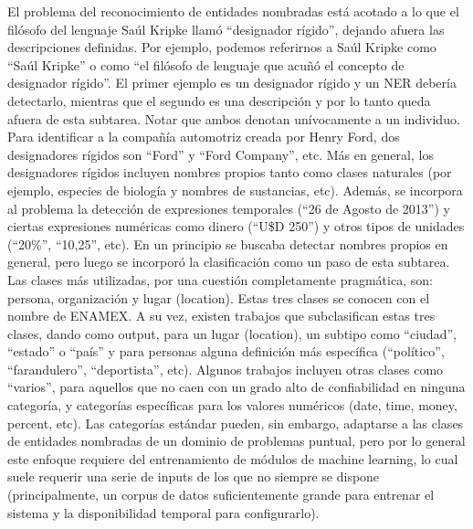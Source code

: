 El problema del reconocimiento de entidades nombradas está acotado a lo que el filósofo del lenguaje Saúl Kripke llamó “designador rígido”, dejando afuera las descripciones definidas. Por ejemplo, podemos referirnos a Saúl Kripke como “Saúl Kripke” o como “el filósofo de lenguaje que acuñó el concepto de designador rígido”. El primer ejemplo es un designador rígido y un NER debería detectarlo, mientras que el segundo es una descripción y por lo tanto queda afuera de esta subtarea. Notar que ambos denotan unívocamente a un individuo. Para identificar a la compañía automotriz creada por Henry Ford, dos designadores rígidos son “Ford” y “Ford Company”, etc. Más en general, los designadores rígidos incluyen nombres propios tanto como clases naturales (por ejemplo, especies de biología y nombres de sustancias, etc). Además, se incorpora al problema la detección de expresiones temporales (“26 de Agosto de 2013”) y ciertas expresiones numéricas como dinero (“U\$D 250”) y otros tipos de unidades (“20\%”, “10,25”, etc). En un principio se buscaba detectar nombres propios en general, pero luego se incorporó la clasificación como un paso de esta subtarea. Las clases más utilizadas, por una cuestión completamente pragmática, son: persona, organización y lugar (location). Estas tres clases se conocen con el nombre de ENAMEX. A su vez, existen trabajos que subclasifican estas tres clases, dando como output, para un lugar (location), un subtipo como  “ciudad”, “estado” o  “país” y para personas alguna definición más específica (“político”, “farandulero”, “deportista”, etc). Algunos trabajos incluyen otras clases como “varios”, para aquellos que no caen con un grado alto de confiabilidad en ninguna categoría, y categorías específicas para los valores numéricos (date, time, money, percent, etc). Las categorías estándar pueden, sin embargo, adaptarse a las clases de entidades nombradas de un dominio de problemas puntual, pero por lo general este enfoque requiere del entrenamiento de módulos de machine learning, lo cual suele requerir una serie de inputs de los que no siempre se dispone (principalmente, un corpus de datos suficientemente grande para entrenar el sistema y la disponibilidad temporal para configurarlo).


